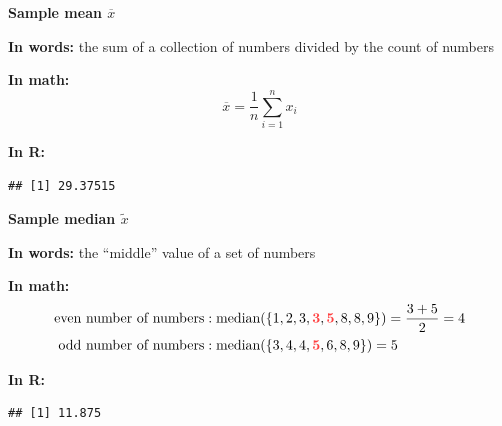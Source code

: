 \documentclass[ignorenonframetext,]{beamer}
\newenvironment{Shaded}{\begin{snugshade}}{\end{snugshade}}
\newcommand{\KeywordTok}[1]{\textcolor[rgb]{0.13,0.29,0.53}{\textbf{#1}}}
\newcommand{\NormalTok}[1]{#1}
\newcommand{\OperatorTok}[1]{\textcolor[rgb]{0.81,0.36,0.00}{\textbf{#1}}}
\begin{document}
\begin{frame}[fragile]{}
\protect\hypertarget{section-30}{}

\textbf{\large Sample mean $\overline{x}$}

\vspace{2ex}

\textbf{In words:} the sum of a collection of numbers divided by the
count of numbers

\vspace{2ex}

\textbf{In math:} \[\overline{x}=\frac{1}{n}\sum_{i=1}^n x_i\]

\vspace{2ex}

\textbf{In R:}

\vspace{1ex}\scriptsize

\begin{Shaded}
\end{Shaded}

\begin{verbatim}
## [1] 29.37515
\end{verbatim}

\end{frame}

\begin{frame}[fragile]{}
\protect\hypertarget{section-31}{}

\textbf{\large Sample median $\widetilde{x}$}

\vspace{2ex}

\textbf{In words:} the ``middle'' value of a set of numbers

\vspace{2ex}

\textbf{In math:} \begin{align*}
\text{even number of numbers}&: \textrm{median}(\{1, 2, 3,\mathbf{\color{coralred}3}, \mathbf{\color{coralred}5}, 8,8,9\})= \frac{3+5}{2}=4\\
\text{odd number of numbers}&: \textrm{median}(\{3, 4, 4,\mathbf{\color{coralred}5}, 6, 8,9\})= 5\end{align*}

\vspace{2ex}

\textbf{In R:}

\vspace{1ex}\scriptsize

\begin{Shaded}
\end{Shaded}

\begin{verbatim}
## [1] 11.875
\end{verbatim}

\end{frame}
\end{document}
